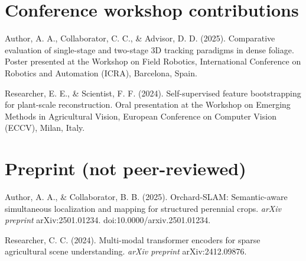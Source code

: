 \section*{Conference workshop contributions}

Author, A. A., Collaborator, C. C., & Advisor, D. D. (2025). Comparative evaluation of single-stage and two-stage 3D tracking paradigms in dense foliage. Poster presented at the Workshop on Field Robotics, International Conference on Robotics and Automation (ICRA), Barcelona, Spain.

Researcher, E. E., & Scientist, F. F. (2024). Self-supervised feature bootstrapping for plant-scale reconstruction. Oral presentation at the Workshop on Emerging Methods in Agricultural Vision, European Conference on Computer Vision (ECCV), Milan, Italy.

\section*{Preprint (not peer-reviewed)}

Author, A. A., & Collaborator, B. B. (2025). Orchard-SLAM: Semantic-aware simultaneous localization and mapping for structured perennial crops. \textit{arXiv preprint} arXiv:2501.01234. doi:10.0000/arxiv.2501.01234.

Researcher, C. C. (2024). Multi-modal transformer encoders for sparse agricultural scene understanding. \textit{arXiv preprint} arXiv:2412.09876.